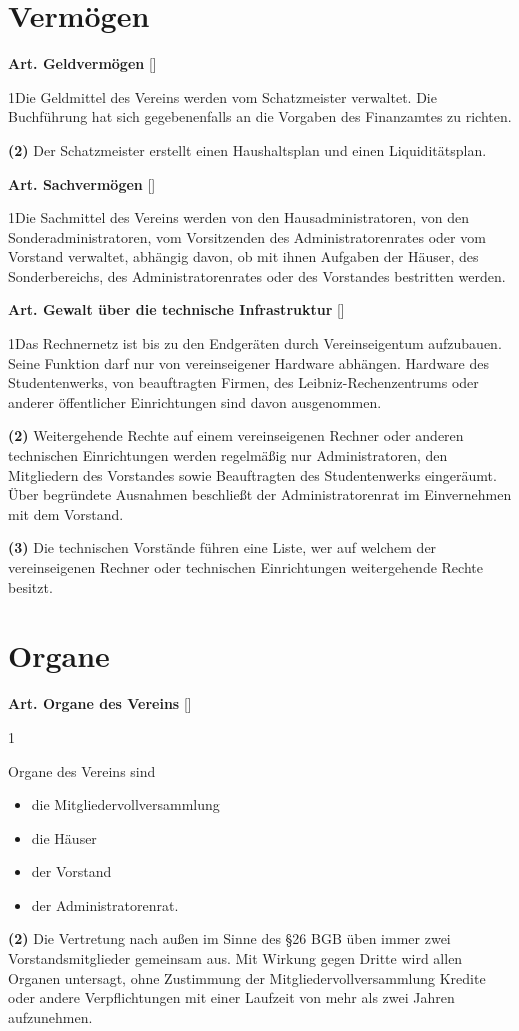 \documentclass[12pt]{article}
\newcommand{\Abschnitt}[1]{\section{#1}}
\newcommand{\Satz}[2]{

\begin{samepage}
{\bf (#1)} #2
\end{samepage}
}
\newenvironment{Artikel}[2]{
\bigskip \centerline{{\bf Art. #1} [#2]}
\nopagebreak
}{
}
\begin{document}
\Abschnitt{Vermögen}

\begin{Artikel}{11}{Geldvermögen}

\Satz{1}{Die Geldmittel des Vereins werden vom Schatzmeister verwaltet.  Die
Buch\-führung hat sich gegebenenfalls an die Vorgaben des Finanzamtes zu
richten.}

\Satz{2}{Der Schatzmeister erstellt einen Haushaltsplan und einen
Liquiditätsplan.}

\end{Artikel}

\begin{Artikel}{12}{Sachvermögen}

\Satz{1}{Die Sachmittel des Vereins werden von den Hausadministratoren, von den
Sonderadministratoren, vom Vorsitzenden des Administratorenrates oder vom
Vorstand verwaltet, abhängig davon, ob mit ihnen Aufgaben der Häuser, des
Sonderbereichs, des Administratorenrates oder des Vorstandes bestritten werden.}

\end{Artikel}

\begin{Artikel}{13}{Gewalt über die technische Infrastruktur}

\Satz{1}{Das Rechnernetz ist bis zu den Endgeräten durch Vereinseigentum
aufzubauen. Seine Funktion darf nur von vereinseigener Hardware abhängen. 
Hardware des Studentenwerks, von beauftragten Firmen, des
Leibniz-Rechenzentrums oder anderer öffentlicher Einrichtungen sind davon
ausgenommen.}

\Satz{2}{Weitergehende Rechte auf einem vereinseigenen Rechner oder anderen
technischen Einrichtungen werden regelmäßig nur Administratoren, den
Mitgliedern des Vorstandes sowie Beauftragten des Studentenwerks eingeräumt.
Über begründete Ausnahmen beschließt der Administratorenrat im Einvernehmen mit
dem Vorstand.}

\Satz{3}{Die technischen Vorstände führen eine Liste, wer auf welchem der
vereinseigenen Rechner oder technischen Einrichtungen weitergehende Rechte
besitzt.}

\end{Artikel}

\Abschnitt{Organe}

\begin{Artikel}{14}{Organe des Vereins}

\Satz{1}{Organe des Vereins sind  
\begin{itemize}
\item die Mitgliedervollversammlung
\item die Häuser
\item der Vorstand
\item der Administratorenrat.
\end{itemize}}

\Satz{2}{Die Vertretung nach außen im Sinne des \S 26 BGB üben immer zwei
Vorstandsmitglieder gemeinsam aus. Mit Wirkung gegen Dritte wird allen Organen
untersagt, ohne Zustimmung der Mitgliedervollversammlung Kredite oder andere
Verpflichtungen mit einer Laufzeit von mehr als zwei Jahren aufzunehmen.}

\end{Artikel}
\end{document}

